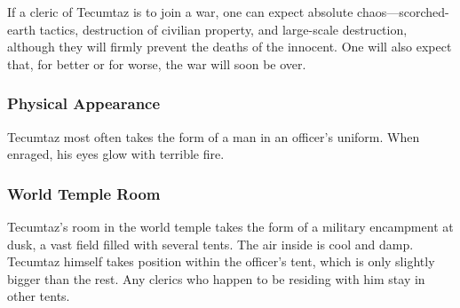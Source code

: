If a cleric of Tecumtaz is to join a war, one can expect absolute chaos---scorched-earth tactics, destruction of civilian property, and large-scale destruction, although they will firmly prevent the deaths of the innocent.
One will also expect that, for better or for worse, the war will soon be over.

\subsubsection*{Physical Appearance} 
Tecumtaz most often takes the form of a man in an officer's uniform.
When enraged, his eyes glow with terrible fire.

\subsubsection*{World Temple Room}
Tecumtaz's room in the world temple takes the form of a military encampment at dusk, a vast field filled with several tents.
The air inside is cool and damp.
Tecumtaz himself takes position within the officer's tent, which is only slightly bigger than the rest.
Any clerics who happen to be residing with him stay in other tents.